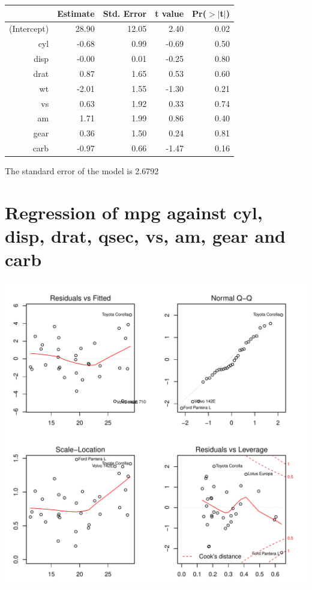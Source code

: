 \documentclass{article}\usepackage[]{graphicx}\usepackage[]{color}
\makeatletter
\def\maxwidth{ %
  \ifdim\Gin@nat@width>\linewidth
    \linewidth
  \else
    \Gin@nat@width
  \fi
}
\newenvironment{knitrout}{}{} %
\makeatother
\begin{document}
\begin{table}[ht]
\centering
\begin{tabular}{rrrrr}
  \hline
 & Estimate & Std. Error & t value & Pr($>$$|$t$|$) \\ 
  \hline
(Intercept) & 28.90 & 12.05 & 2.40 & 0.02 \\ 
  cyl & -0.68 & 0.99 & -0.69 & 0.50 \\ 
  disp & -0.00 & 0.01 & -0.25 & 0.80 \\ 
  drat & 0.87 & 1.65 & 0.53 & 0.60 \\ 
  wt & -2.01 & 1.55 & -1.30 & 0.21 \\ 
  vs & 0.63 & 1.92 & 0.33 & 0.74 \\ 
  am & 1.71 & 1.99 & 0.86 & 0.40 \\ 
  gear & 0.36 & 1.50 & 0.24 & 0.81 \\ 
  carb & -0.97 & 0.66 & -1.47 & 0.16 \\ 
   \hline
\end{tabular}
\end{table}




The standard error of the model is 2.6792

\newpage

\section{Regression of mpg against cyl, disp, drat, qsec, vs, am, gear and carb }
\begin{knitrout}
\color{fgcolor}

{\centering \includegraphics[width=\maxwidth]{figure/lm-cyl-disp-drat-qsec-vs-am-gear-carb} 

}



\end{knitrout}
\end{document}
